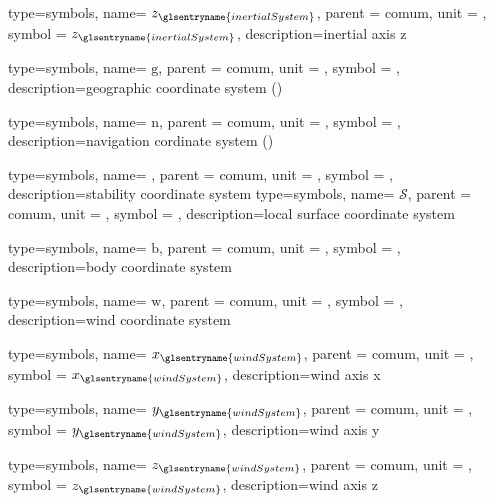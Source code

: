 {type=symbols,
  name= \ensuremath{z_{\glsentryname{inertialSystem}}},
  parent = {comum},
  unit = \unexpanded{},
  symbol = \ensuremath{z_{\glsentryname{inertialSystem}}},
  description={inertial axis z}
}

{type=symbols,
  name= \ensuremath{\mathrm{g}},
  parent = {comum},
  unit = \unexpanded{},
  symbol = ,
  description={geographic coordinate system ()}
}

{type=symbols,
  name= \ensuremath{\mathrm{n}},
  parent = {comum},
  unit = \unexpanded{},
  symbol = ,
  description={navigation cordinate system  ()}
}



{type=symbols,
  name= \ensuremath{\mathrm{}},
  parent = {comum},
  unit = \unexpanded{},
  symbol = ,
  description={stability coordinate system}
}
{type=symbols,
  name= \ensuremath{\mathcal{S}},
  parent = {comum},
  unit = \unexpanded{},
  symbol = ,
  description={local surface coordinate system}
}

{type=symbols,
  name= \ensuremath{\mathrm{b}},
  parent = {comum},
  unit = \unexpanded{},
  symbol = ,
  description={body coordinate system}
}

{type=symbols,
  name= \ensuremath{\mathrm{w}},
  parent = {comum},
  unit = \unexpanded{},
  symbol = ,
  description={wind coordinate system}
}

{type=symbols,
  name= \ensuremath{x_{\glsentryname{windSystem}}},
  parent = {comum},
  unit = \unexpanded{},
  symbol = \ensuremath{x_{\glsentryname{windSystem}}},
  description={wind axis x}
}

{type=symbols,
  name= \ensuremath{y_{\glsentryname{windSystem}}},
  parent = {comum},
  unit = \unexpanded{},
  symbol = \ensuremath{y_{\glsentryname{windSystem}}},
  description={wind axis y}
}



{type=symbols,
  name= \ensuremath{z_{\glsentryname{windSystem}}},
  parent = {comum},
  unit = \unexpanded{},
  symbol = \ensuremath{z_{\glsentryname{windSystem}}},
  description={wind axis z}
}


